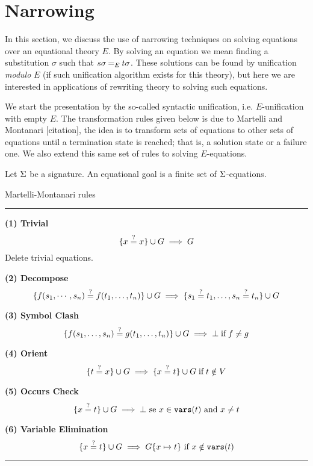 \section{Narrowing}

In this section, we discuss the use of narrowing techniques on solving equations over an equational theory $E$. By solving an equation we mean finding a substitution $\sigma$ such that $s \sigma \mathbin{=_{E}} t\sigma$. These solutions can be found by unification \textit{modulo} $E$ (if such unification algorithm exists for this theory), but here we are interested in applications of rewriting theory to solving such equations.

We start the presentation by the so-called syntactic unification, i.e. $E$-unification with empty $E$. The transformation rules given below is due to Martelli and Montanari [citation], the idea is to transform sets of equations to other sets of equations until a termination state is reached; that is, a solution state or a failure one. We also extend this same set of rules to solving $E$-equations.

\begin{definition}
    Let $\Sigma$ be a signature. An equational goal is a finite set of $\Sigma$-equations.
\end{definition}

\begin{table}[ht]
	\caption{Martelli-Montanari rules}
	\label{table:unify_inf_rules}
	{\small
		\hrule
		\vspace{10pt}

		\textbf{(1) Trivial}
		$$\{ x\overset{?}{=}x \} \cup G \implies G $$
		Delete trivial equations.

		\textbf{(2) Decompose}
        $$\{f(s_1, \cdots, s_n)\overset{?}{=}f(t_1, \dots, t_n)\} \cup G \implies \{s_1\overset{?}{=}t_1, \dots , s_n\overset{?}{=}t_n \} \cup G$$

		\textbf{(3) Symbol Clash}
		$$\{ f(s_1, \dots, s_n)\overset{?}{=}g(t_1, \dots, t_n) \} \cup G \implies \bot \; \text{if} \; f \neq g $$

		\textbf{(4) Orient}
		$$\{ t\overset{?}{=}x \} \cup G \implies \{ x\overset{?}{=}t \} \cup G \; \text{if} \; t \notin V$$

		\textbf{(5) Occurs Check}
		$$\{ x\overset{?}{=}t \} \cup G \implies \bot \text{ se } x \in \mathtt{vars}(t) \text{ and } x \neq t$$

		\textbf{(6) Variable Elimination}
		$$\{ x\overset{?}{=}t \} \cup G \implies G\{x \mapsto t\} \text{ if } x \notin \mathtt{vars}(t)$$
		\hrule
	}
\end{table}

